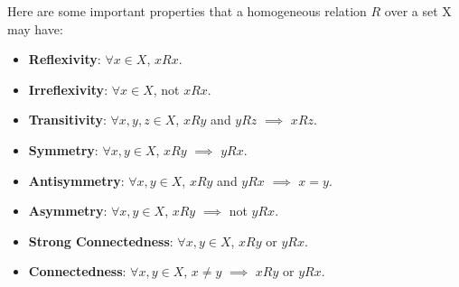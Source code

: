 Here are some important properties that a homogeneous relation $R$ over a set X may have:
\begin{itemize}
    \item \textbf{Reflexivity}: $\forall x \in X$, $xRx$.
    \item \textbf{Irreflexivity}: $\forall x \in X$, not $xRx$.
    \item \textbf{Transitivity}: $\forall x, y, z \in X$, $xRy$ and $yRz$ $\implies$ $xRz$.
    \item \textbf{Symmetry}: $\forall x, y \in X$, $xRy$ $\implies$ $yRx$.
    \item \textbf{Antisymmetry}: $\forall x, y \in X$, $xRy$ and $yRx$ $\implies$ $x = y$.
    \item \textbf{Asymmetry}: $\forall x, y \in X$, $xRy$ $\implies$ not $yRx$.
    \item \textbf{Strong Connectedness}: $\forall x, y \in X$, $xRy$ or $yRx$.
    \item \textbf{Connectedness}: $\forall x, y \in X$, $x\ne y$ $\implies$ $xRy$ or $yRx$.
\end{itemize}
